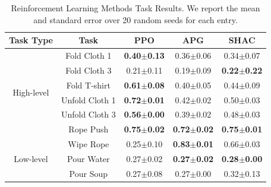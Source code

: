 \begin{table}[t]
\centering
\fontsize{7.5}{7.5}\selectfont
\begin{tabularx}{\textwidth}{c @{\extracolsep{\fill}} cccc}
\toprule
Task Type & Task & PPO & APG & SHAC  \\
\midrule
\multirow{6}{*}{High-level} & Fold Cloth 1 & \textbf{0.40$\pm$0.13} & 0.36$\pm$0.06  & 0.34$\pm$0.07 \\
& Fold Cloth 3 & 0.21$\pm$0.11 & 0.19$\pm$0.09  & \textbf{0.22$\pm$0.22} \\
& Fold T-shirt & \textbf{0.61$\pm$0.08} & 0.40$\pm$0.05  & 0.44$\pm$0.09  \\
&Unfold Cloth 1 & \textbf{0.72$\pm$0.01}  &0.42$\pm$0.02  & 0.50$\pm$0.03 \\
&Unfold Cloth 3  & \textbf{0.56$\pm$0.00} &0.39$\pm$0.02  & 0.48$\pm$0.03 \\
& Rope Push  & \textbf{0.75$\pm$0.02} &\textbf{0.72$\pm$0.02} & \textbf{0.75$\pm$0.01} \\
\midrule
\multirow{3}{*}{Low-level}
&Wipe Rope & 0.25$\pm$0.10 & \textbf{0.83$\pm$0.01} & 0.66$\pm$0.03 \\
&Pour Water & 0.27$\pm$0.02 & \textbf{0.27$\pm$0.02} & \textbf{0.28$\pm$0.00}  \\
& Pour Soup  &   0.27$\pm$0.08  & 0.27$\pm$0.00 & 0.32$\pm$0.13\\
\bottomrule
\end{tabularx}
\caption{\small Reinforcement Learning Methods Task Results. We report the mean and standard error over 20 random seeds for each entry.}
\label{table:RL_results}
\end{table}

